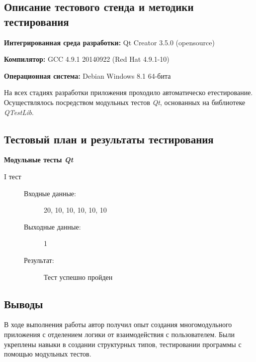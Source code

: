 \documentclass[12pt,a4paper]{report}
\begin{document}
\subsection{Описание тестового стенда и методики тестирования}

\begin{flushleft}
\textbf{Интегрированная среда разработки:} Qt Creator 3.5.0 (opensource)

\textbf{Компилятор:} GCC 4.9.1 20140922 (Red Hat 4.9.1-10)

\textbf{Операционная система:} Debian Windows 8.1 64-бита

\end{flushleft}

На всех стадиях разработки приложения проходило автоматическо етестирование. Осуществлялось посредством модульных тестов \textit{Qt}, основанных на библиотеке  \textit{QTestLib}. 

\subsection{Тестовый план и результаты тестирования}
\begin{description}
\item \textbf{Модульные тесты \textit{Qt}}
\begin{description}
\item[I тест]
\hspace{\parindent}
\begin{flushleft}
\begin{description}
\item[Входные данные:] 20, 10, 10, 10, 10, 10
\item[Выходные данные:] 1
\item[Результат:] Тест успешно пройден
\end{description}
\end{flushleft}
\end{description}
\end{description}

\subsection{Выводы}
В ходе выполнения работы автор получил опыт создания многомодульного приложения с отделением логики от взаимодействия с пользователем. Были укреплены навыки в создании структурных типов, тестировании программы с помощью модульных тестов.
\end{document}
